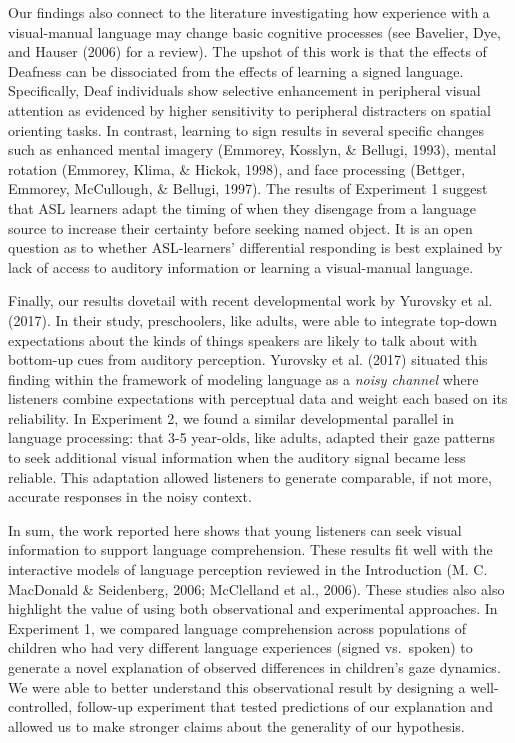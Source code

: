 \documentclass[,man,floatsintext]{apa6}
\begin{document}
Our findings also connect to the literature investigating how experience
with a visual-manual language may change basic cognitive processes (see
Bavelier, Dye, and Hauser (2006) for a review). The upshot of this work
is that the effects of Deafness can be dissociated from the effects of
learning a signed language. Specifically, Deaf individuals show
selective enhancement in peripheral visual attention as evidenced by
higher sensitivity to peripheral distracters on spatial orienting tasks.
In contrast, learning to sign results in several specific changes such
as enhanced mental imagery (Emmorey, Kosslyn, \& Bellugi, 1993), mental
rotation (Emmorey, Klima, \& Hickok, 1998), and face processing
(Bettger, Emmorey, McCullough, \& Bellugi, 1997). The results of
Experiment 1 suggest that ASL learners adapt the timing of when they
disengage from a language source to increase their certainty before
seeking named object. It is an open question as to whether ASL-learners'
differential responding is best explained by lack of access to auditory
information or learning a visual-manual language.

Finally, our results dovetail with recent developmental work by Yurovsky
et al. (2017). In their study, preschoolers, like adults, were able to
integrate top-down expectations about the kinds of things speakers are
likely to talk about with bottom-up cues from auditory perception.
Yurovsky et al. (2017) situated this finding within the framework of
modeling language as a \emph{noisy channel} where listeners combine
expectations with perceptual data and weight each based on its
reliability. In Experiment 2, we found a similar developmental parallel
in language processing: that 3-5 year-olds, like adults, adapted their
gaze patterns to seek additional visual information when the auditory
signal became less reliable. This adaptation allowed listeners to
generate comparable, if not more, accurate responses in the noisy
context.

In sum, the work reported here shows that young listeners can seek
visual information to support language comprehension. These results fit
well with the interactive models of language perception reviewed in the
Introduction (M. C. MacDonald \& Seidenberg, 2006; McClelland et al.,
2006). These studies also also highlight the value of using both
observational and experimental approaches. In Experiment 1, we compared
language comprehension across populations of children who had very
different language experiences (signed vs.~spoken) to generate a novel
explanation of observed differences in children's gaze dynamics. We were
able to better understand this observational result by designing a
well-controlled, follow-up experiment that tested predictions of our
explanation and allowed us to make stronger claims about the generality
of our hypothesis.
\end{document}
